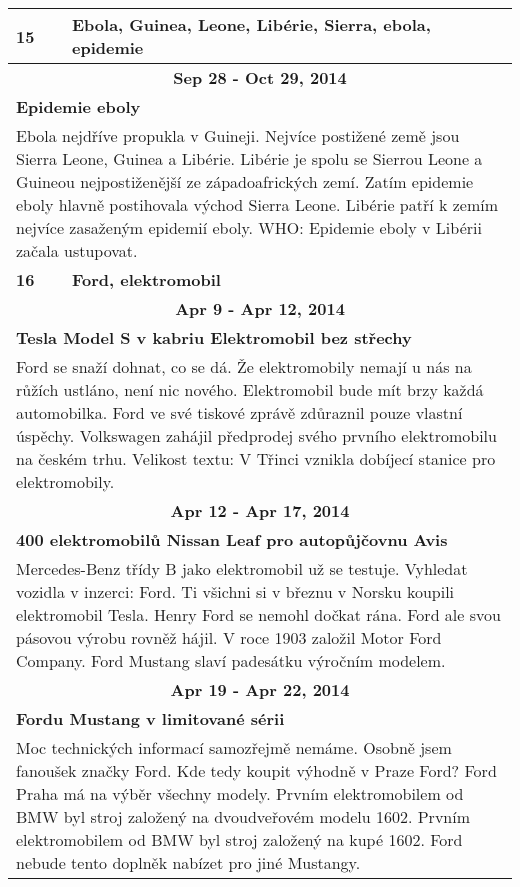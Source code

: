\begin{tabularx}{\linewidth}{l l}
            \bf 15 & \bf Ebola, Guinea, Leone, Libérie, Sierra, ebola, epidemie \\ \midrule
            
                \multicolumn{2}{c}{\bf Sep 28 - Oct 29, 2014} \\
                \multicolumn{2}{p{\linewidth}}{\bf Epidemie eboly} \\
                \multicolumn{2}{p{\linewidth}}{Ebola nejdříve propukla v Guineji. Nejvíce postižené země jsou Sierra Leone, Guinea a Libérie. Libérie je spolu se Sierrou Leone a Guineou nejpostiženější ze západoafrických zemí. Zatím epidemie eboly hlavně postihovala východ Sierra Leone. Libérie patří k zemím nejvíce zasaženým epidemií eboly. WHO: Epidemie eboly v Libérii začala ustupovat.} \\ \midrule
                [1.5pt]

            \bf 16 & \bf Ford, elektromobil \\ \midrule
            
                \multicolumn{2}{c}{\bf Apr 9 - Apr 12, 2014} \\
                \multicolumn{2}{p{\linewidth}}{\bf Tesla Model S v kabriu Elektromobil bez střechy} \\
                \multicolumn{2}{p{\linewidth}}{Ford se snaží dohnat, co se dá. Že elektromobily nemají u nás na růžích ustláno, není nic nového. Elektromobil bude mít brzy každá automobilka. Ford ve své tiskové zprávě zdůraznil pouze vlastní úspěchy. Volkswagen zahájil předprodej svého prvního elektromobilu na českém trhu. Velikost textu: V Třinci vznikla dobíjecí stanice pro elektromobily.} \\ \midrule
                
                \multicolumn{2}{c}{\bf Apr 12 - Apr 17, 2014} \\
                \multicolumn{2}{p{\linewidth}}{\bf 400 elektromobilů Nissan Leaf pro autopůjčovnu Avis} \\
                \multicolumn{2}{p{\linewidth}}{Mercedes-Benz třídy B jako elektromobil už se testuje. Vyhledat vozidla v inzerci: Ford. Ti všichni si v březnu v Norsku koupili elektromobil Tesla. Henry Ford se nemohl dočkat rána. Ford ale svou pásovou výrobu rovněž hájil. V roce 1903 založil Motor Ford Company. Ford Mustang slaví padesátku výročním modelem.} \\ \midrule
                
                \multicolumn{2}{c}{\bf Apr 19 - Apr 22, 2014} \\
                \multicolumn{2}{p{\linewidth}}{\bf Fordu Mustang v limitované sérii} \\
                \multicolumn{2}{p{\linewidth}}{Moc technických informací samozřejmě nemáme. Osobně jsem fanoušek značky Ford. Kde tedy koupit výhodně v Praze Ford? Ford Praha má na výběr všechny modely. Prvním elektromobilem od BMW byl stroj založený na dvoudveřovém modelu 1602. Prvním elektromobilem od BMW byl stroj založený na kupé 1602. Ford nebude tento doplněk nabízet pro jiné Mustangy.} \\ \midrule
                

\end{tabularx}
